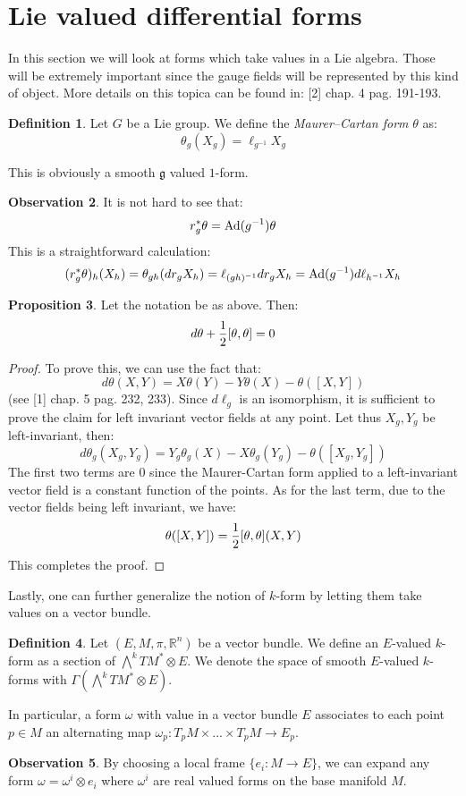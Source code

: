 \documentclass[12pt,a4paper]{report}
\theoremstyle{definition}
\newtheorem{Def}{Definition}[chapter]
\theoremstyle{Theorem}
\newtheorem{Prop}[Def]{Proposition}
\theoremstyle{definition}
\theoremstyle{definition}
\newtheorem{Obs}[Def]{Observation}
\begin{document}
	\section{Lie valued differential forms}
	In this section we will look at forms which take values in a Lie algebra. Those will be extremely important since the gauge fields will be represented by this kind of object.
	More details on this topica can be found in: [2] chap. 4 pag. 191-193.
	\begin{Def}
		Let $G$ be a Lie group. We define the \textit{Maurer–Cartan form} $\theta$ as:
		$$\theta_g(X_g)=\ell_{g^{-1}}X_g$$
	\end{Def}
	This is obviously a smooth $\mathfrak{g}$ valued $1$-form.
	\begin{Obs}\label{Ex_3.4.2}
		It is not hard to see that:
		$$r_g^*\theta=\hbox{Ad}(g^{-1})\theta$$
		This is a straightforward calculation:
		$$(r_g^*\theta)_{h}(X_{h})=\theta_{gh}(dr_gX_h)=\ell_{(gh)^{-1}}dr_gX_h=\hbox{Ad}(g^{-1})d\ell_{h^{-1}}X_h$$
	\end{Obs}
	\begin{Prop}
		Let the notation be as above. Then:
		$$d\theta+{1\over 2}[\theta,\theta]=0$$
	\end{Prop}
	\begin{proof}
		To prove this, we can use the fact that:
		$$d\theta(X,Y)=X\theta(Y)-Y\theta(X)-\theta([X,Y])$$
		(see [1] chap. 5 pag. 232, 233). Since $d\ell_g$ is an isomorphism, it is sufficient to prove the claim for left invariant vector fields at any point. Let thus $X_g,Y_g$ be left-invariant, then:
		$$d\theta_g(X_g,Y_g)=Y_g\theta_g(X)-X\theta_g(Y_g)-\theta([X_g,Y_g])$$
		The first two terms are 0 since the Maurer-Cartan form applied to a left-invariant vector field is a constant function of the points. As for the last term, due to the vector fields being left invariant, we have:
		$$\theta([X,Y])={1\over 2}[\theta,\theta](X,Y)$$
		This completes the proof.
	\end{proof}
	Lastly, one can further generalize the notion of $k$-form by letting them take values on a vector bundle.
	\begin{Def}
		Let $(E,M,\pi, \mathbb{R}^n)$ be a vector bundle. We define an $E$-valued $k$-form as a section of $\bigwedge^kTM^*\otimes E$. We denote the space of smooth $E$-valued $k$-forms with $\Gamma(\bigwedge^kTM^*\otimes E)$.
	\end{Def}
	In particular, a form $\omega$ with value in a vector bundle $E$ associates to each point $p\in M$ an alternating map $\omega_p:T_pM\times...\times T_pM\rightarrow E_p$.
	\begin{Obs}
		By choosing a local frame $\{e_i:M\rightarrow E\}$, we can expand any form $\omega=\omega^i\otimes e_i$ where $\omega^i$ are real valued forms on the base manifold $M$.
	\end{Obs}
\end{document}
